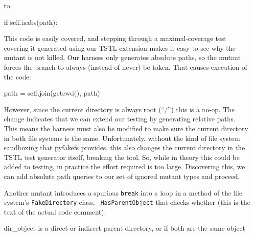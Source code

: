 \documentclass{svjour3}
\begin{document}
\noindent to

\begin{code}
         if self.isabs(path):
\end{code}

This code is easily covered, and stepping through a maximal-coverage
test covering it generated using our TSTL extension makes it easy to
see why the mutant is not killed.  Our harness only generates absolute
paths, so the mutant forces the branch to always (instead of never) be
taken.  That causes execution of the code:

\begin{code}
            path = self.join(getcwd(), path)
\end{code}

However, since the current directory is always root (``/'') this is a
no-op.  The change indicates that we can extend our testing by
generating relative paths.  This means the harness must also be
modified to make sure the current directory in both file systems is
the same.  Unfortunately, without the kind of file system sandboxing
that pyfakefs provides, this also changes the current directory in the
TSTL test generator itself, breaking the tool.  So, while in theory
this could be added to testing, in practice the effort required is too
large.  Discovering this, we can add absolute path queries to our set
of ignored mutant types and proceed. 

Another mutant introduces a spurious {\tt break} into a loop in a
method of the file system's {\tt FakeDirectory} class, {\tt
  HasParentObject} that checks whether (this is the text of the actual
code comment):

{\scriptsize
\begin{code}
dir\_object is a direct or indirect parent directory, or if both are the same object
\end{code}
}
\end{document}
